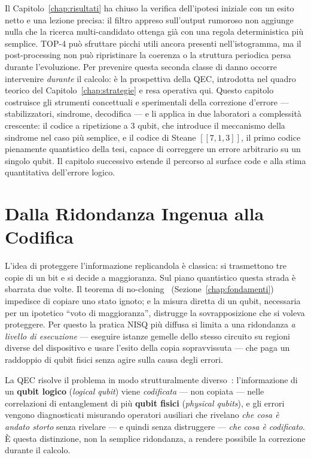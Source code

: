 \begin{onehalfspace}

Il Capitolo~\ref{chap:risultati} ha chiuso la verifica dell'ipotesi iniziale con un esito netto e una lezione precisa: il filtro appreso sull'output rumoroso non aggiunge nulla che la ricerca multi-candidato ottenga già con una regola deterministica più semplice. TOP-4 può sfruttare picchi utili ancora presenti nell'istogramma, ma il post-processing non può ripristinare la coerenza o la struttura periodica persa durante l'evoluzione. Per prevenire questa seconda classe di danno occorre intervenire \emph{durante} il calcolo: è la prospettiva della \ac{QEC}, introdotta nel quadro teorico del Capitolo~\ref{chap:strategie} e resa operativa qui. Questo capitolo costruisce gli strumenti concettuali e sperimentali della correzione d'errore --- stabilizzatori, sindrome, decodifica --- e li applica in due laboratori a complessità crescente: il codice a ripetizione a 3 qubit, che introduce il meccanismo della sindrome nel caso più semplice, e il codice di Steane $[[7,1,3]]$, il primo codice pienamente quantistico della tesi, capace di correggere un errore arbitrario su un singolo qubit. Il capitolo successivo estende il percorso al surface code e alla stima quantitativa dell'errore logico.

\section{Dalla Ridondanza Ingenua alla Codifica}
\label{sec:ridondanza_codifica}

L'idea di proteggere l'informazione replicandola è classica: si trasmettono tre copie di un bit e si decide a maggioranza. Sul piano quantistico questa strada è sbarrata due volte. Il teorema di no-cloning~\cite{wootters1982} (Sezione~\ref{chap:fondamenti}) impedisce di copiare uno stato ignoto; e la misura diretta di un qubit, necessaria per un ipotetico ``voto di maggioranza'', distrugge la sovrapposizione che si voleva proteggere. Per questo la pratica NISQ più diffusa si limita a una ridondanza \emph{a livello di esecuzione} --- eseguire istanze gemelle dello stesso circuito su regioni diverse del dispositivo e usare l'esito della copia sopravvissuta --- che paga un raddoppio di qubit fisici senza agire sulla causa degli errori.

La \ac{QEC} risolve il problema in modo strutturalmente diverso~\cite{shorcorrection1995, steane1996, roffe2019}: l'informazione di un \textbf{qubit logico} (\textit{logical qubit}) viene \emph{codificata} --- non copiata --- nelle correlazioni di entanglement di più \textbf{qubit fisici} (\textit{physical qubits}), e gli errori vengono diagnosticati misurando operatori ausiliari che rivelano \emph{che cosa è andato storto} senza rivelare --- e quindi senza distruggere --- \emph{che cosa è codificato}. È questa distinzione, non la semplice ridondanza, a rendere possibile la correzione durante il calcolo.


\end{onehalfspace}
